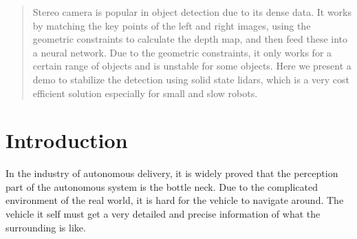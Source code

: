 \documentclass[balance,upint,subscriptcorrection,varvw,nofoot, mathalfa=cal=boondoxo,spanish,french,vietnamese,russian,greek,pdf-a,fontspec,colorlinks]{asmeconf}
\begin{document}




\begin{abstract}

Stereo camera is popular in object detection due to its dense data. It works by matching
the key points of the left and right images, using the geometric constraints to calculate
the depth map, and then feed these into a neural network. Due to the geometric
constraints, it only works for a certain range of objects and is unstable for some objects.
Here we present a demo to stabilize the detection using solid state lidars, which is a very
cost efficient solution especially for small and slow robots.
\end{abstract}






\section{Introduction}
In the industry of autonomous delivery, it is widely proved that the perception part of the autonomous system is the bottle neck. Due to the complicated environment of the real world, it is hard for the vehicle to navigate around. The vehicle it self must get a very detailed and precise information of what the surrounding is like.
\end{document}
